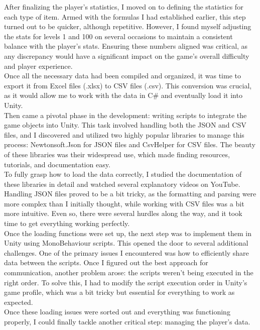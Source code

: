 \documentclass{article}
\begin{document}
After finalizing the player’s statistics, I moved on to defining the statistics for each type of item. Armed with the formulas I had established earlier, this step turned out to be quicker, although repetitive. However, I found myself adjusting the stats for levels 1 and 100 on several occasions to maintain a consistent balance with the player's stats. Ensuring these numbers aligned was critical, as any discrepancy would have a significant impact on the game's overall difficulty and player experience.\\

Once all the necessary data had been compiled and organized, it was time to export it from Excel files (.xlsx) to CSV files (.csv). This conversion was crucial, as it would allow me to work with the data in C\# and eventually load it into Unity.\\

Then came a pivotal phase in the development: writing scripts to integrate the game objects into Unity. This task involved handling both the JSON and CSV files, and I discovered and utilized two highly popular libraries to manage this process: Newtonsoft.Json for JSON files and CsvHelper for CSV files. The beauty of these libraries was their widespread use, which made finding resources, tutorials, and documentation easy.\\

To fully grasp how to load the data correctly, I studied the documentation of these libraries in detail and watched several explanatory videos on YouTube. Handling JSON files proved to be a bit tricky, as the formatting and parsing were more complex than I initially thought, while working with CSV files was a bit more intuitive. Even so, there were several hurdles along the way, and it took time to get everything working perfectly.\\

Once the loading functions were set up, the next step was to implement them in Unity using MonoBehaviour scripts. This opened the door to several additional challenges. One of the primary issues I encountered was how to efficiently share data between the scripts. Once I figured out the best approach for communication, another problem arose: the scripts weren’t being executed in the right order. To solve this, I had to modify the script execution order in Unity's game profile, which was a bit tricky but essential for everything to work as expected.\\

Once these loading issues were sorted out and everything was functioning properly, I could finally tackle another critical step: managing the player’s data.\\
\end{document}

